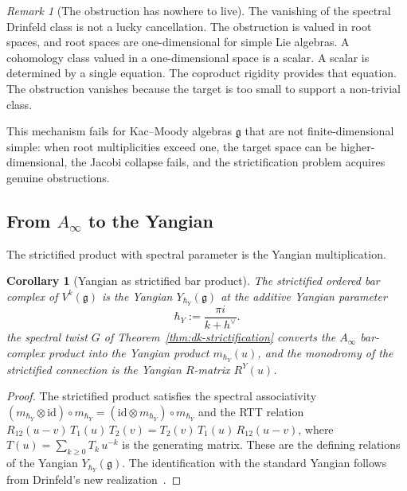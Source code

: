 \documentclass[11pt,reqno]{amsart}
\newtheorem{corollary}[theorem]{Corollary}
\theoremstyle{definition}
\theoremstyle{remark}
\newtheorem{remark}[theorem]{Remark}
\newcommand{\Ainf}{A_{\infty}}
\newcommand{\fg}{\mathfrak{g}}
\newcommand{\id}{\mathrm{id}}
\newcommand{\kp}{k + h^{\vee}}
\numberwithin{equation}{section}
\begin{document}
\begin{remark}[The obstruction has nowhere to live]
The vanishing of the spectral Drinfeld class is not a
lucky cancellation.  The obstruction is valued in root
spaces, and root spaces are one-dimensional for simple
Lie algebras.  A cohomology class valued in a
one-dimensional space is a scalar.  A scalar is determined
by a single equation.  The coproduct rigidity provides
that equation.  The obstruction vanishes because the target
is too small to support a non-trivial class.

This mechanism fails for Kac--Moody algebras $\fg$ that
are not finite-dimensional simple: when root multiplicities
exceed one, the target space can be higher-dimensional, the
Jacobi collapse fails, and the strictification problem
acquires genuine obstructions.
\end{remark}

\subsection{From $\Ainf$ to the Yangian}

The strictified product with spectral parameter is the
Yangian multiplication.

\begin{corollary}[Yangian as strictified bar product]
\label{cor:dk-yangian-strict}
The strictified ordered bar complex of $V^k(\fg)$ is the
Yangian $Y_{\hbar_Y}(\fg)$ at the additive Yangian parameter
\[
\hbar_Y:=\frac{\pi i}{\kp}.
\]
the spectral twist $G$ of
Theorem~\textup{\ref{thm:dk-strictification}} converts the
$\Ainf$ bar-complex product into the Yangian product
$m_{\hbar_Y}(u)$, and the monodromy of the strictified
connection is the Yangian $R$-matrix $R^Y(u)$.
\end{corollary}

\begin{proof}
The strictified product satisfies the spectral associativity
$(m_{\hbar_Y} \otimes \id) \circ m_{\hbar_Y}
= (\id \otimes m_{\hbar_Y}) \circ m_{\hbar_Y}$
and the RTT relation
$R_{12}(u-v)\,T_1(u)\,T_2(v)
= T_2(v)\,T_1(u)\,R_{12}(u-v)$,
where $T(u) = \sum_{k \geq 0} T_k\,u^{-k}$ is the
generating matrix.  These are the defining relations of the
Yangian $Y_{\hbar_Y}(\fg)$.  The identification with the
standard Yangian follows from Drinfeld's new
realization~\cite{Drinfeld88}.
\end{proof}

\end{document}
